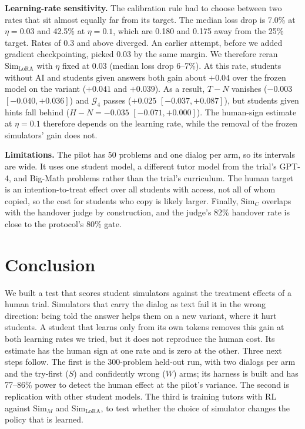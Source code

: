 \documentclass{article} %
\newcommand{\simM}{\ensuremath{\text{Sim}_M}}
\newcommand{\simC}{\ensuremath{\text{Sim}_C}}
\newcommand{\simL}{\ensuremath{\text{Sim}_{\text{LoRA}}}}
\newcommand{\gate}[1]{\ensuremath{\mathcal{G}_{#1}}}
\begin{document}
\textbf{Learning-rate sensitivity.} The calibration rule had to choose between two rates that sit almost equally far from its target. The median loss drop is 7.0\% at $\eta=0.03$ and 42.5\% at $\eta=0.1$, which are 0.180 and 0.175 away from the 25\% target. Rates of 0.3 and above diverged. An earlier attempt, before we added gradient checkpointing, picked 0.03 by the same margin. We therefore reran \simL{} with $\eta$ fixed at 0.03 (median loss drop 6--7\%). At this rate, students without AI and students given answers both gain about $+0.04$ over the frozen model on the variant ($+0.041$ and $+0.039$). As a result, $T-N$ vanishes ($-0.003$ $[-0.040,+0.036]$) and \gate{4} passes ($+0.025$ $[-0.037,+0.087]$), but students given hints fall behind ($H-N=-0.035$ $[-0.071,+0.000]$). The human-sign estimate at $\eta=0.1$ therefore depends on the learning rate, while the removal of the frozen simulators' gain does not.

\textbf{Limitations.} The pilot has 50 problems and one dialog per arm, so its intervals are wide. It uses one student model, a different tutor model from the trial's GPT-4, and Big-Math problems rather than the trial's curriculum. The human target is an intention-to-treat effect over all students with access, not all of whom copied, so the cost for students who copy is likely larger. Finally, \simC{} overlaps with the handover judge by construction, and the judge's 82\% handover rate is close to the protocol's 80\% gate.

\section{Conclusion}
\label{sec:conclusion}

We built a test that scores student simulators against the treatment effects of a human trial. Simulators that carry the dialog as text fail it in the wrong direction: being told the answer helps them on a new variant, where it hurt students. A student that learns only from its own tokens removes this gain at both learning rates we tried, but it does not reproduce the human cost. Its estimate has the human sign at one rate and is zero at the other. Three next steps follow. The first is the 300-problem held-out run, with two dialogs per arm and the try-first ($S$) and confidently wrong ($W$) arms; its harness is built and has 77--86\% power to detect the human effect at the pilot's variance. The second is replication with other student models. The third is training tutors with RL against \simM{} and \simL{}, to test whether the choice of simulator changes the policy that is learned.



\end{document}
